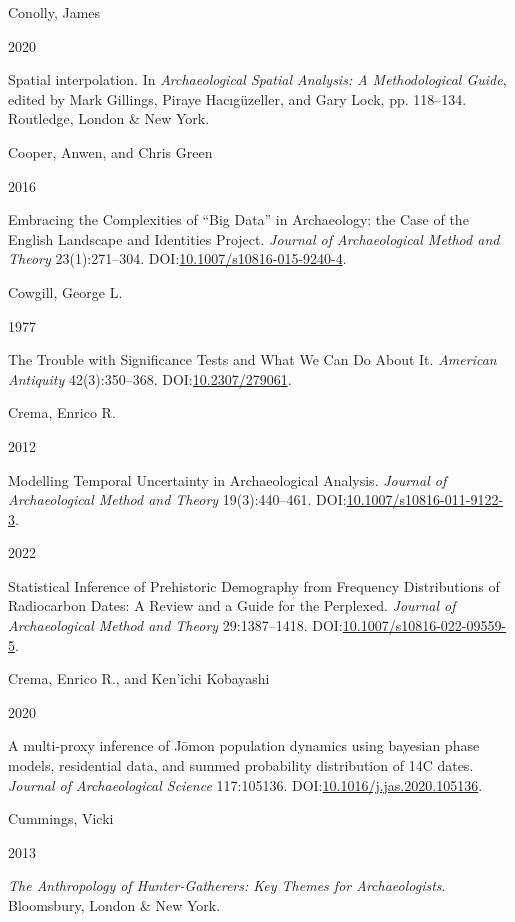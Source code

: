 \documentclass[
  12pt,
  a4paper,
  oneside]{book}
\newlength{\cslhangindent}
\newlength{\csllabelwidth}
\newlength{\cslentryspacingunit} %
\newenvironment{CSLReferences}[2] %
 {%
  \setlength{\parindent}{0pt}
  \ifodd #1
  \let\oldpar\par
  \def\par{\hangindent=\cslhangindent\oldpar}
  \fi
  \setlength{\parskip}{#2\cslentryspacingunit}
 }%
 {}
\newcommand{\CSLBlock}[1]{#1\hfill\break}
\newcommand{\CSLLeftMargin}[1]{\parbox[t]{\csllabelwidth}{#1}}
\newcommand{\CSLRightInline}[1]{\parbox[t]{\linewidth - \csllabelwidth}{#1}\break}
\begin{document}
\begin{CSLReferences}{0}{0}
\leavevmode{}%
\CSLBlock{Conolly, James}
\CSLLeftMargin{ 2020}%
\CSLRightInline{Spatial interpolation. In \emph{{Archaeological Spatial Analysis: A Methodological Guide}}, edited by Mark Gillings, Piraye Hacıgüzeller, and Gary Lock, pp. 118--134. Routledge, London \& New York.}

\leavevmode{}%
\CSLBlock{Cooper, Anwen, and Chris Green}
\CSLLeftMargin{ 2016}%
\CSLRightInline{{Embracing the Complexities of {``Big Data''} in Archaeology: the Case of the English Landscape and Identities Project}. \emph{Journal of Archaeological Method and Theory} 23(1):271--304. DOI:\href{https://doi.org/10.1007/s10816-015-9240-4}{10.1007/s10816-015-9240-4}.}

\leavevmode{}%
\CSLBlock{Cowgill, George L.}
\CSLLeftMargin{ 1977}%
\CSLRightInline{{The Trouble with Significance Tests and What We Can Do About It}. \emph{American Antiquity} 42(3):350--368. DOI:\href{https://doi.org/10.2307/279061}{10.2307/279061}.}

\leavevmode{}%
\CSLBlock{Crema, Enrico R.}
\CSLLeftMargin{ 2012}%
\CSLRightInline{Modelling Temporal Uncertainty in Archaeological Analysis. \emph{Journal of Archaeological Method and Theory} 19(3):440--461. DOI:\href{https://doi.org/10.1007/s10816-011-9122-3}{10.1007/s10816-011-9122-3}.}

\leavevmode{}%
\CSLLeftMargin{ 2022 }%
\CSLRightInline{{Statistical Inference of Prehistoric Demography from Frequency Distributions of Radiocarbon Dates: A Review and a Guide for the Perplexed}. \emph{Journal of Archaeological Method and Theory} 29:1387--1418. DOI:\href{https://doi.org/10.1007/s10816-022-09559-5}{10.1007/s10816-022-09559-5}.}

\leavevmode{}%
\CSLBlock{Crema, Enrico R., and Ken'ichi Kobayashi}
\CSLLeftMargin{ 2020}%
\CSLRightInline{{A multi-proxy inference of Jōmon population dynamics using bayesian phase models, residential data, and summed probability distribution of 14C dates}. \emph{Journal of Archaeological Science} 117:105136. DOI:\href{https://doi.org/10.1016/j.jas.2020.105136}{10.1016/j.jas.2020.105136}.}

\leavevmode{}%
\CSLBlock{Cummings, Vicki}
\CSLLeftMargin{ 2013}%
\CSLRightInline{\emph{{The Anthropology of Hunter-Gatherers: Key Themes for Archaeologists}}. Bloomsbury, London \& New York.}


\end{CSLReferences}
\end{document}
